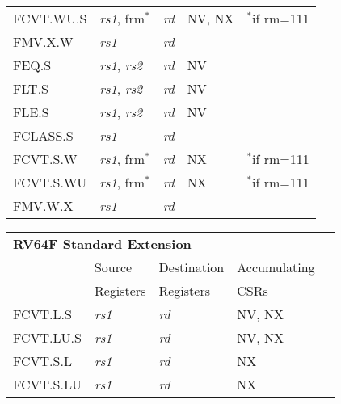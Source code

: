 \begin{tabular}{p{3cm}|p{3cm}|p{2cm}|p{4cm}|p{4cm}}
   FCVT.WU.S & {\em rs1}, frm$^*$ & {\em rd} & NV, NX & $^*$if rm=111  \\
   \cline{2-4}
   FMV.X.W & {\em rs1} & {\em rd} &   & \\
   \cline{2-4}
   FEQ.S & {\em rs1}, {\em rs2} & {\em rd} & NV &   \\
   \cline{2-4}
   FLT.S & {\em rs1}, {\em rs2} & {\em rd} & NV &   \\
   \cline{2-4}
   FLE.S & {\em rs1}, {\em rs2} & {\em rd} & NV &   \\
   \cline{2-4}
   FCLASS.S & {\em rs1} & {\em rd} &   & \\
   \cline{2-4}
   FCVT.S.W & {\em rs1}, frm$^*$ & {\em rd} & NX & $^*$if rm=111  \\
   \cline{2-4}
   FCVT.S.WU & {\em rs1}, frm$^*$ & {\em rd} & NX & $^*$if rm=111  \\
   \cline{2-4}
   FMV.W.X & {\em rs1} & {\em rd} &   & \\
   \cline{2-4}
\end{tabular}

\begin{tabular}{p{3cm}|p{3cm}|p{2cm}|p{4cm}|p{4cm}}
  \multicolumn{4}{l}{\bf RV64F Standard Extension} \\
  \cline{2-4}
   & Source    & Destination & Accumulating \\
   & Registers & Registers   & CSRs \\
  \cline{2-4}
   FCVT.L.S & {\em rs1} & {\em rd} & NV, NX &   \\
   \cline{2-4}
   FCVT.LU.S & {\em rs1} & {\em rd} & NV, NX &   \\
   \cline{2-4}
   FCVT.S.L & {\em rs1} & {\em rd} & NX &   \\
   \cline{2-4}
   FCVT.S.LU & {\em rs1} & {\em rd} & NX &   \\
   \cline{2-4}
\end{tabular}

